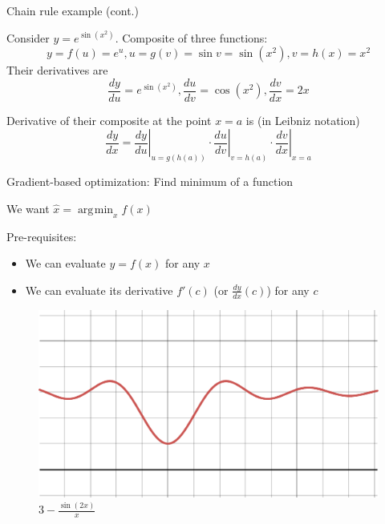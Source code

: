 \documentclass[12pt,aspectratio=169,handout]{beamer}
\DeclareMathOperator*{\argmin}{arg\!\min}
\begin{document}
\begin{frame}{Chain rule example (cont.)}
	
	Consider $y=e^{\sin(x^{2})}$. Composite of three functions:
	$$y = f(u) = e^u, u = g(v) = \sin v = \sin (x^2), v = h(x) = x^2$$
	Their derivatives are
	$$\frac{dy}{du} = e^{\sin(x^{2})}, \frac{du}{dv} = \cos (x^2), \frac{dv}{dx} = 2x$$
	
	\pause
	
	Derivative of their composite at the point $x = a$ is (in Leibniz notation)
	$$
	{\frac {dy}{dx}}=\left.{\frac {dy}{du}}\right|_{u=g(h(a))}\cdot \left.{\frac {du}{dv}}\right|_{v=h(a)}\cdot \left.{\frac {dv}{dx}}\right|_{x=a}
	$$
	
\end{frame}


\begin{frame}{Gradient-based optimization: Find minimum of a function}
	
	We want $\hat{x} = \argmin_x f(x)$
	
	Pre-requisites:
	
	\begin{itemize}
		\item We can evaluate $y = f(x)$ for any $x$
		\item We can evaluate its derivative $f'(c)$ (or $\frac{dy}{dx}(c)$) for any $c$
	\end{itemize}
	
	\begin{figure}
		\includegraphics[width=0.4\linewidth]{img/desmos-graph1.pdf}	
		\caption{$3-\frac{\sin\left(2x\right)}{x}$}
	\end{figure}
	
\end{frame}
\end{document}
